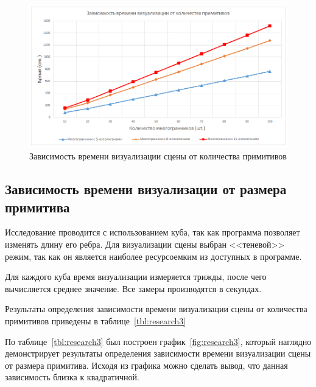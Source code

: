 \clearpage

\begin{figure}[h] 
	\centering
	\includegraphics[width=1\textwidth]{images/research2.png}
	\caption{Зависимость времени визуализации сцены от количества примитивов} 
	\label{fig:research2} 
\end{figure}

\subsection{Зависимость времени визуализации от размера примитива}

Исследование проводится с использованием куба, так как программа позволяет изменять длину его ребра. Для визуализации сцены выбран <<теневой>> режим, так как он является наиболее ресурсоемким из доступных в программе.

Для каждого куба время визуализации измеряется трижды, после чего вычисляется среднее значение. Все замеры производятся в секундах.

Результаты определения зависимости времени визуализации сцены от количества примитивов приведены в таблице~\ref{tbl:research3}

По таблице~\ref{tbl:research3} был построен график~\ref{fig:research3}, который наглядно демонстрирует результаты определения зависимости времени визуализации сцены от размера примитива. Исходя из графика можно сделать вывод, что данная зависимость близка к квадратичной.

\clearpage

